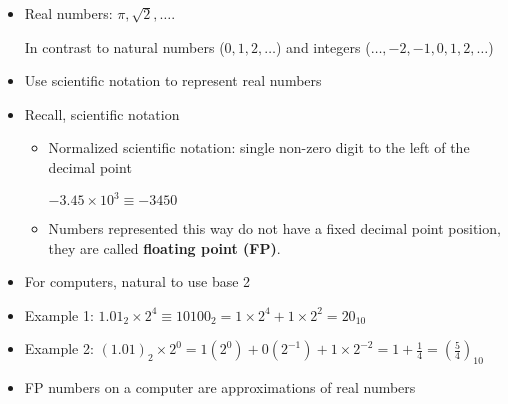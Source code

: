 


\begin{frame}[fragile]
\begin{itemize}
\item Real numbers: $\pi, \sqrt{2}, \dots$. 

In contrast to natural numbers ($0, 1, 2, \dots$) and integers ($\dots, -2, -1, 0, 1, 2, \dots$)

\item Use scientific notation to represent real numbers
 \item Recall, scientific notation
 \begin{itemize}
   
        \item  Normalized scientific notation:  single non-zero digit to the left of the decimal point 
        
        $-3.45 \times 10^3 \equiv -3450$
    \item Numbers represented this way do not have a fixed decimal point position, they are called \textbf{floating point (FP)}.
\end{itemize}
\item For computers, natural to use base 2
\item Example 1: $1.01_2 \times 2^4 \equiv 10100_2 = 1 \times 2^4 + 1 \times 2^2 = 20_{10}$
\item Example 2: $(1.01)_2 \times 2^0 = 1 (2^0) + 0 (2^{-1})+ 1 \times 2^{-2} = 1 + \frac{1}{4} = \left(\frac{5}{4}\right)_{10}$
\item FP numbers on a computer are approximations of real numbers


\end{itemize}
\end{frame}
